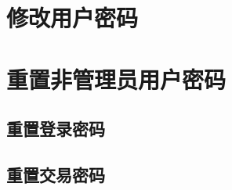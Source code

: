 
\section{修改用户密码} 
\label{sec:passwd}


\section{重置非管理员用户密码} 
\label{sec:passwd_reset}

\subsection{重置登录密码} 
\label{sub:passwd_login_reset}


\subsection{重置交易密码} 
\label{sub:passwd_trade_reset}
